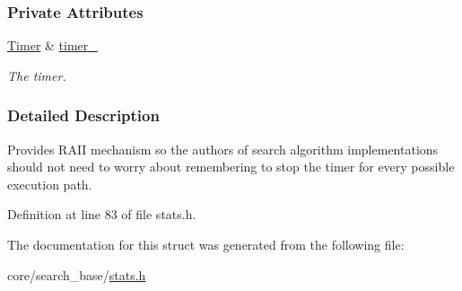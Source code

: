 \subsubsection*{Private Attributes}
\begin{DoxyCompactItemize}
\item 
\hyperlink{structTimer}{Timer} \& \hyperlink{structTimerLock_aad95c8ced4b02c39d05d973706d6cb47}{timer\+\_\+}\hypertarget{structTimerLock_aad95c8ced4b02c39d05d973706d6cb47}{}\label{structTimerLock_aad95c8ced4b02c39d05d973706d6cb47}

\begin{DoxyCompactList}\small\item\em The timer. \end{DoxyCompactList}\end{DoxyCompactItemize}


\subsubsection{Detailed Description}
Provides R\+A\+II mechanism so the authors of search algorithm implementations should not need to worry about remembering to stop the timer for every possible execution path. 

Definition at line 83 of file stats.\+h.



The documentation for this struct was generated from the following file\+:\begin{DoxyCompactItemize}
\item 
core/search\+\_\+base/\hyperlink{stats_8h}{stats.\+h}\end{DoxyCompactItemize}
